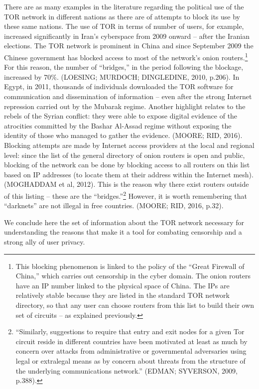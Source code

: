 There are as many examples in the literature regarding the political use of the TOR network in different nations as there are of attempts to block its use by these same nations. The use of TOR in terms of number of users, for example, increased significantly in Iran's cyberspace from 2009 onward -- after the Iranian elections. The TOR network is prominent in China and since September 2009 the Chinese government has blocked access to most of the network's onion routers.\footnote{This blocking phenomenon is linked to the policy of the ``Great Firewall of China,'' which carries out censorship in the cyber domain. The onion routers have an IP number linked to the physical space of China. The IPs are relatively stable because they are listed in the standard TOR network directory, so that any user can choose routers from this list to build their own set of circuits -- as explained previously.} For this reason, the number of ``bridges,'' in the period following the blockage, increased by 70\%. (LOESING; MURDOCH; DINGLEDINE, 2010, p.206). In Egypt, in 2011, thousands of individuals downloaded the TOR software for communication and dissemination of information -- even after the strong Internet repression carried out by the Mubarak regime. Another highlight relates to the rebels of the Syrian conflict: they were able to expose digital evidence of the atrocities committed by the Bashar Al-Assad regime without exposing the identity of those who managed to gather the evidence. (MOORE; RID, 2016). Blocking attempts are made by Internet access providers at the local and regional level: since the list of the general directory of onion routers is open and public, blocking of the network can be done by blocking access to all routers on this list based on IP addresses (to locate them at their address within the Internet mesh). (MOGHADDAM et al, 2012). This is the reason why there exist routers outside of this listing -- these are the ``bridges.''\footnote{``Similarly, suggestions to require that entry and exit nodes for a given Tor circuit reside in different countries have been motivated at least as much by concern over attacks from administrative or governmental adversaries using legal or extralegal means as by concern about threats from the structure of the underlying communications network.'' (EDMAN; SYVERSON, 2009, p.388).} However, it is worth remembering that ``darknets'' are not illegal in free countries. (MOORE; RID, 2016, p.32).

We conclude here the set of information about the TOR network necessary for understanding the reasons that make it a tool for combating censorship and a strong ally of user privacy.

